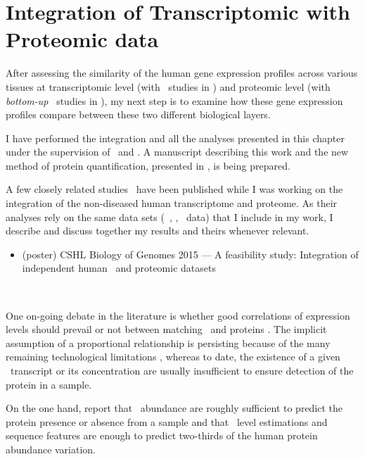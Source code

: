 \chapter{Integration of Transcriptomic with Proteomic data}\label{ch:Integration}
After assessing the similarity of the human gene expression profiles
across various tissues
at transcriptomic level (with \Rnaseq\ studies in )
and proteomic level (with \emph{bottom-up} \ms\ studies in ),
my next step is to examine how these gene expression profiles
compare between these two different biological layers.

I have performed the integration and all the analyses presented in this chapter
under the supervision of \alvis\ and \jyoti.
A manuscript describing this work
and the new method of protein quantification, presented in ,
is being prepared.

A few closely related studies~ have
been published while I was working on
the integration of the non-diseased human transcriptome and proteome.
As their analyses rely on the same data sets (\ie\ \uhlen, \gtex, \pandey\ data)
that I include in my work,
I describe and discuss together my results and theirs
whenever relevant.

\derivativeWork{}
\begin{itemize}[topsep=0pt,nosep]
    \item (poster) CSHL  Biology of Genomes 2015 --- A feasibility study:
        Integration of independent human \Rnaseq\ and proteomic datasets
\end{itemize}

\clearpage\

\vspace{-1cm}

One on-going debate in the literature is
whether good correlations of expression levels should prevail or not
between matching \mRNAs\ and proteins .
The implicit assumption of a proportional relationship is persisting
because of the many remaining technological limitations ,
whereas to date, the existence of a given \mRNA\ transcript or its concentration
are usually insufficient to ensure detection of the protein in a sample.

On the one hand,
\citet{Ramakrishnan2009-lv} report that
\mRNAs\ abundance are roughly sufficient to predict
the protein presence or absence from a sample and
\citet{Vogel2010-ux} that
\mRNA\ level estimations and sequence features are enough to predict
two-thirds of the human protein abundance variation.

